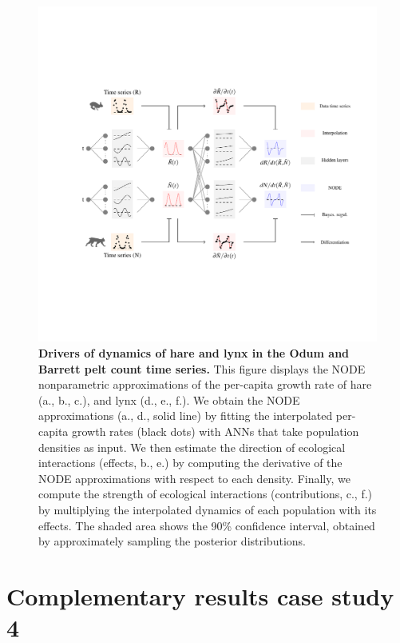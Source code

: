 \documentclass[11pt, oneside]{article}
\begin{document}
\newpage
\begin{figure}[H]
\includegraphics[width=1\linewidth,page=25]{figures/main.pdf}
\caption{
    \textbf{Drivers of dynamics of hare and lynx in the Odum and Barrett pelt count time series.}
    This figure displays the NODE nonparametric approximations of the per-capita growth rate of hare (a., b., c.), and lynx (d., e., f.).
    We obtain the NODE approximations (a., d., solid line) by fitting the interpolated per-capita growth rates (black dots) with ANNs that take population densities as input.
    We then estimate the direction of ecological interactions (effects, b., e.) by computing the derivative of the NODE approximations with respect to each density.
    Finally, we compute the strength of ecological interactions (contributions, c., f.) by multiplying the interpolated dynamics of each population with its effects.
    The shaded area shows the 90\% confidence interval, obtained by approximately sampling the posterior distributions. 
}
\end{figure}
\newpage

\newpage
\section{Complementary results case study 4}
\end{document}

